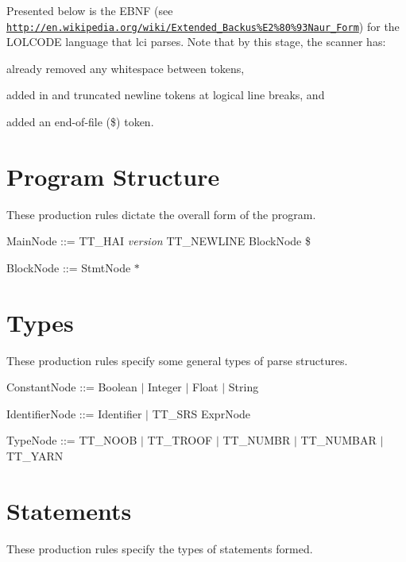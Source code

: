 Presented below is the E\+B\+NF (see \href{http://en.wikipedia.org/wiki/Extended_Backus%E2%80%93Naur_Form}{\tt http\+://en.\+wikipedia.\+org/wiki/\+Extended\+\_\+\+Backus\%\+E2\%80\%93\+Naur\+\_\+\+Form}) for the L\+O\+L\+C\+O\+DE language that {\ttfamily lci} parses. Note that by this stage, the scanner has\+:
\begin{DoxyItemize}
\item already removed any whitespace between tokens,
\item added in and truncated newline tokens at logical line breaks, and
\item added an end-\/of-\/file ({\ttfamily \$}) token.
\end{DoxyItemize}\hypertarget{lolebnf_progebnf}{}\section{Program Structure}\label{lolebnf_progebnf}
These production rules dictate the overall form of the program.

\begin{DoxyParagraph}{}
Main\+Node \+:\+:= {\ttfamily T\+T\+\_\+\+H\+AI} {\itshape version} {\ttfamily T\+T\+\_\+\+N\+E\+W\+L\+I\+NE} Block\+Node {\ttfamily \$} 
\end{DoxyParagraph}
\begin{DoxyParagraph}{}
Block\+Node \+:\+:= Stmt\+Node $\ast$
\end{DoxyParagraph}
\hypertarget{lolebnf_typesebnf}{}\section{Types}\label{lolebnf_typesebnf}
These production rules specify some general types of parse structures.

\begin{DoxyParagraph}{}
Constant\+Node \+:\+:= Boolean $\vert$ Integer $\vert$ Float $\vert$ String
\end{DoxyParagraph}
\begin{DoxyParagraph}{}
Identifier\+Node \+:\+:= Identifier $\vert$ {\ttfamily T\+T\+\_\+\+S\+RS} Expr\+Node
\end{DoxyParagraph}
\begin{DoxyParagraph}{}
Type\+Node \+:\+:= {\ttfamily T\+T\+\_\+\+N\+O\+OB} $\vert$ {\ttfamily T\+T\+\_\+\+T\+R\+O\+OF} $\vert$ {\ttfamily T\+T\+\_\+\+N\+U\+M\+BR} $\vert$ {\ttfamily T\+T\+\_\+\+N\+U\+M\+B\+AR} $\vert$ {\ttfamily T\+T\+\_\+\+Y\+A\+RN} 
\end{DoxyParagraph}
\hypertarget{lolebnf_stmtebnf}{}\section{Statements}\label{lolebnf_stmtebnf}
These production rules specify the types of statements formed.

